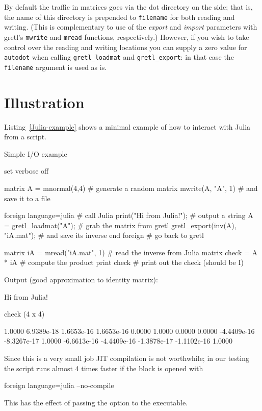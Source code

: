 By default the traffic in matrices goes via the dot directory on the
 side; that is, the name of this directory is prepended to
\texttt{filename} for both reading and writing. (This is complementary
to use of the \textsl{export} and \textsl{import} parameters with
gretl's \texttt{mwrite} and \texttt{mread} functions,
respectively.) However, if you wish to take control over the reading
and writing locations you can supply a zero value for
\texttt{autodot} when calling \verb|gretl_loadmat| and
\verb|gretl_export|: in that case the \texttt{filename} argument is
used as is.

\section{Illustration}

Listing~\ref{Julia-example} shows a minimal example of how to interact
with Julia from a  script.

\begin{script}[htbp]
  \caption{Simple  I/O example}
\begin{scode}
set verbose off

matrix A = mnormal(4,4)                # generate a random matrix
mwrite(A, "A", 1)                      # and save it to a file

foreign language=julia                 # call Julia
    print("Hi from Julia!\n");         # output a string
    A = gretl_loadmat("A");            # grab the matrix from gretl
    gretl_export(inv(A), "iA.mat");    # and save its inverse
end foreign                            # go back to gretl

matrix iA = mread("iA.mat", 1)         # read the inverse from Julia
matrix check = A * iA                  # compute the product
print check                            # print out the check (should be I)
\end{scode}
Output (good approximation to identity matrix):
\begin{code}
Hi from Julia!

check (4 x 4)

      1.0000   6.9389e-18   1.6653e-16   1.6653e-16 
      0.0000       1.0000       0.0000       0.0000 
 -4.4409e-16  -8.3267e-17       1.0000  -6.6613e-16 
 -4.4409e-16  -1.3878e-17  -1.1102e-16       1.0000 
\end{code}
\label{Julia-example}
\end{script}

Since this is a very small job JIT compilation is not worthwhile; in
our testing the script runs almost 4 times faster if the 
block is opened with
\begin{code}
foreign language=julia --no-compile
\end{code}
This has the effect of passing the option  to the
 executable.


